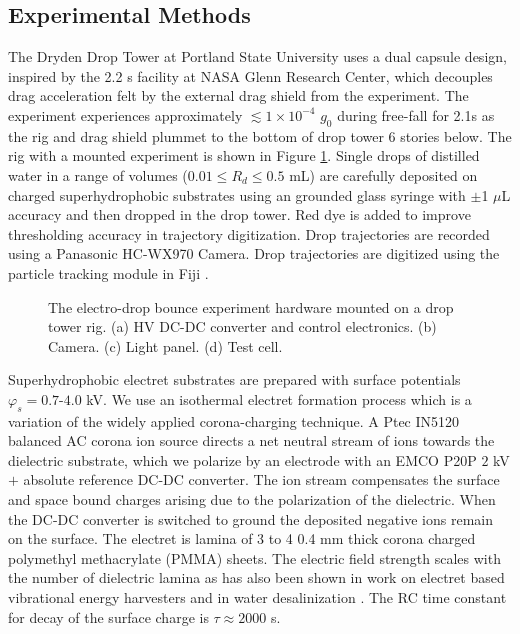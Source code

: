 \documentclass[aip,reprint, floatfix]{revtex4-1}
\begin{document}
\subsection{Experimental Methods}
The Dryden Drop Tower at Portland State University uses a dual capsule design, inspired by the 2.2 s facility at NASA Glenn Research Center, which decouples drag acceleration felt by the external drag shield from the experiment. The experiment experiences approximately $\lesssim 1 \times 10^{-4}$ $g_0$ during free-fall for 2.1s as the rig and drag shield plummet to the bottom of drop tower 6 stories below. The rig with a mounted experiment is shown in Figure \ref{fig:rig}. Single drops of distilled water in a range of volumes ($0.01 \leq R_d \leq 0.5$ mL) are carefully deposited on charged superhydrophobic substrates using an grounded glass syringe with $\pm $1 $\mu$L accuracy and then dropped in the drop tower. Red dye is added to improve thresholding accuracy in trajectory digitization. Drop trajectories are recorded using a Panasonic HC-WX970 Camera. Drop trajectories are digitized using the particle tracking module in Fiji \cite{schindelin_fiji:_2012}.

\begin{figure}
    \centering
    \fontsize{12pt}{13pt}\selectfont
    \def\svgwidth{\columnwidth}
    \caption{The electro-drop bounce experiment hardware mounted on a drop tower rig. (a) HV DC-DC converter and control electronics. (b) Camera. (c) Light panel. (d) Test cell. \label{fig:rig}}
\end{figure}

Superhydrophobic electret substrates are prepared with surface potentials $\varphi_s = 0.7$-$4.0$ kV. We use an isothermal electret formation process which is a variation of the widely applied corona-charging technique. A Ptec IN5120 balanced AC corona ion source directs a net neutral stream of ions towards the dielectric substrate, which we polarize by an electrode with an EMCO P20P $2$ kV$+$ absolute reference DC-DC converter. The ion stream compensates the surface and space bound charges arising due to the polarization of the dielectric. When the DC-DC converter is switched to ground the deposited negative ions remain on the surface. The electret is lamina of 3 to 4 0.4 mm thick corona charged polymethyl methacrylate (PMMA) sheets. The electric field strength scales with the number of dielectric lamina as has also been shown in work on electret based vibrational energy harvesters \cite{wada_stacking_2012} and in water desalinization \cite{ni_desalination_2005}. The RC time constant for decay of the surface charge is $\tau \approx 2000$ s.
\end{document}
